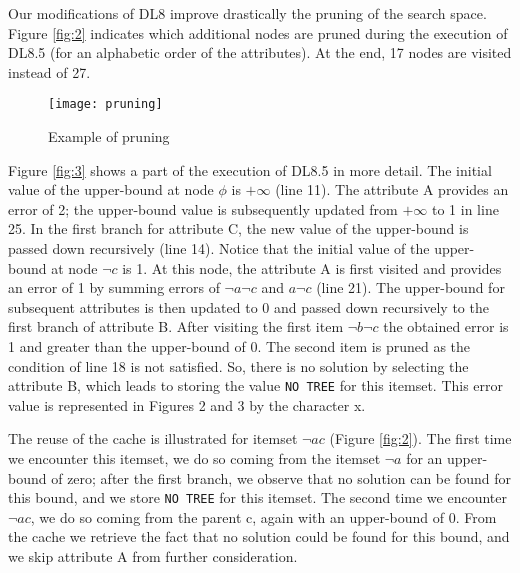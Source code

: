 Our modifications of DL8 improve drastically the pruning of the search space. Figure \ref{fig:2} indicates which additional nodes are pruned during the execution of DL8.5 (for an alphabetic order of the attributes). At the end, 17 nodes are visited instead of 27.

\begin{figure}
	\texttt{[image: pruning]}
	\caption{ Example of pruning}
\end{figure}

Figure \ref{fig:3} shows a part of the execution of DL8.5 in more detail. The initial value of the upper-bound at node $\phi$ is $+\infty$ (line 11). The attribute A provides an error of 2; the upper-bound value is subsequently updated from $+\infty$ to 1 in line 25. In the first branch for attribute C, the new value of the upper-bound is passed down recursively (line 14). Notice that the initial value of the upper-bound at node $\neg c$ is 1. At this node, the attribute A is first visited and provides an error of 1 by summing errors of $\neg a\neg c$ and $a\neg c$ (line 21). The upper-bound for subsequent attributes is then updated to 0 and passed down recursively to the first branch of attribute B. After visiting the first item $\neg b\neg c$ the obtained error is 1 and greater than the upper-bound of 0. The second item is pruned as the condition of line 18 is not satisfied. So, there is no solution by selecting the attribute B, which leads to storing the value \verb|NO TREE| for this itemset. This error value is represented in Figures 2 and 3 by the character x.

The reuse of the cache is illustrated for itemset $\neg ac$ (Figure \ref{fig:2}). The first time we encounter this itemset, we do so coming from the itemset $\neg a$ for an upper-bound of zero; after the first branch, we observe that no solution can be found for this bound, and we store \verb|NO TREE| for this itemset. The second time we encounter $\neg ac$, we do so coming from the parent c, again with an upper-bound of 0. From the cache we retrieve the fact that no solution could be found for this bound, and we skip attribute A from further consideration.
